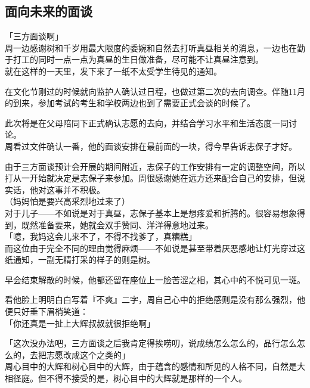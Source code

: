 \subsection{面向未来的面谈}

「三方面谈啊」\\

周一边感谢树和千岁用最大限度的委婉和自然去打听真昼相关的消息，一边也在勤于打工的同时一点一点为真昼的生日做准备，尽可能不让真昼注意到。\\

就在这样的一天里，发下来了一纸不太受学生待见的通知。

在文化节刚过的时候就向监护人确认过日程，也做过第二次的去向调查。伴随11月的到来，参加考试的考生和学校两边也到了需要正式会谈的时候了。

此次将是在父母陪同下正式确认志愿的去向，并结合学习水平和生活态度一同讨论。\\

周看过文件确认一番，他的面谈安排在最前面的一块，得今早告诉志保子才好。

由于三方面谈预计会开展的期间附近，志保子的工作安排有一定的调整空间，所以打从一开始就决定是志保子来参加。周很感谢她在远方还来配合自己的安排，但说实话，他对这事并不积极。\\

（妈妈怕是要兴高采烈地过来了）\\

对于儿子——不如说是对于真昼，志保子基本上是想疼爱和折腾的。很容易想象得到，既然准备要来，她就会双手赞同、洋洋得意地过来。\\

「噫，我妈这会儿来不了，不得不找爹了，真糟糕」\\

而这位由于完全不同的理由觉得麻烦——不如说是甚至带着厌恶感地让灯光穿过这纸通知，一副无精打采的样子的则是树。

早会结束解散的时候，他都还留在座位上一脸苦涩之相，其心中的不悦可见一斑。

看他脸上明明白白写着『不爽』二字，周自己心中的拒绝感则是没有那么强烈，他便只好垂下眉梢笑道：\\

「你还真是一扯上大辉叔叔就很拒绝啊」

「这次没办法吧，三方面谈之后我肯定得挨唠叨，说成绩怎么怎么的，品行怎么怎么的，去把志愿改成这个之类的」\\

周心目中的大辉和树心目中的大辉，由于蕴含的感情和所见的人格不同，自然是大相径庭。但不得不接受的是，树心目中的大辉就是那样的一个人。

